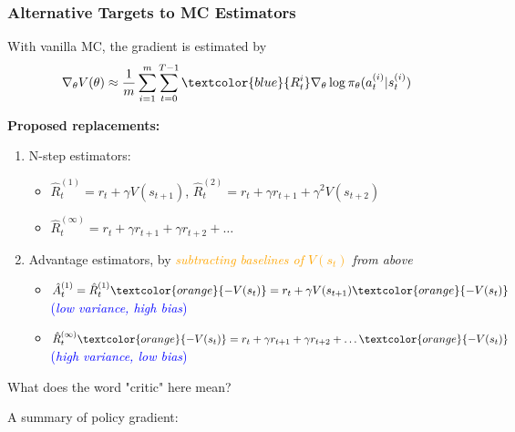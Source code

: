 \documentclass{article}
\begin{document}
\begin{thmbox}
    \subsubsection*{Alternative Targets to MC Estimators}
    With vanilla MC, the gradient is estimated by
    \begin{equation*}
        \nabla_{\theta} V(\theta) \approx \frac{1}{m} \sum_{i = 1}^{m} \sum_{t = 0}^{T-1} \textcolor{blue}{R_{t}^{i}} \nabla_{\theta} \log \pi_{\theta} (a_t^{(i)} | s_t^{(i)})
    \end{equation*}

    \textbf{Proposed replacements:}
    \begin{enumerate}
    \item N-step estimators:
        \begin{itemize}
        \item $\hat{R}_t^{(1)} = r_t + \gamma V(s_{t+1})$, $\hat{R}_t^{(2)} = r_t + \gamma r_{t+1} + \gamma^2 V(s_{t+2})$ 
        \item $\hat{R}_t^{(\infty)} = r_t + \gamma r_{t+1} + \gamma r_{t+2} + \dots$
        \end{itemize}
    \item Advantage estimators, by \textit{\textcolor{orange}{subtracting baselines of $V(s_t)$} from above}
        \begin{itemize}
        \item $\hat{A}_t^{(1)} = \hat{R}_t^{(1)} \textcolor{orange}{- V(s_t)} = r_t + \gamma V(s_{t+1}) \textcolor{orange}{- V(s_t)}$ \quad \quad 
            \quad \quad \textcolor{blue}{(\textit{low variance, high bias})}
        \item $\hat{R}_t^{(\infty)} \textcolor{orange}{- V(s_t)} = r_t + \gamma r_{t+1} + \gamma r_{t+2} + \dots \textcolor{orange}{- V(s_t)}$
            \quad \quad \textcolor{blue}{(\textit{high variance, low bias})}
        \end{itemize}
    \end{enumerate}
\end{thmbox}

\begin{hintbox}
    What does the word "critic" here mean?
\end{hintbox}

A summary of policy gradient:
\end{document}
